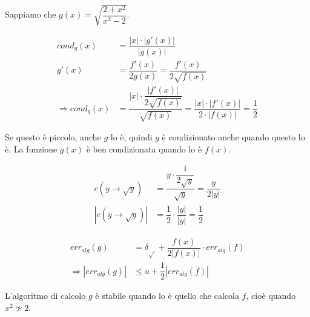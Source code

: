 Sappiamo che $g(x)=\sqrt{\dfrac{2+x^2}{x^2-2}}$.

\begin{center}
\end{center}

\begin{equation*}
\begin{split}
  cond_g(x) &= \dfrac{|x|\cdot|g'(x)|}{|g(x)|}\\[1.5ex]
  g'(x) &= \dfrac{f'(x)}{2g(x)} = \dfrac{f'(x)}{2\sqrt{f(x)}}\\[1.5ex]
  \Rightarrow cond_g(x) &= \dfrac{|x|\cdot \dfrac{|f'(x)|}{2\sqrt{f(x)}}}{\sqrt{f(x)}} = \dfrac{|x|\cdot |f'(x)|}{2\cdot |f(x)|} = \dfrac{1}{2}
\end{split}
\end{equation*}

Se questo è piccolo, anche $g$ lo è, quindi $g$ è condizionato anche quando questo lo è. La funzione $g(x)$ è ben condizionata quando lo è $f(x)$.

\begin{equation*}
\begin{split}
  c(y\rightarrow \sqrt{y}) &= \dfrac{y\cdot \dfrac{1}{2\sqrt{y}}}{\sqrt{y}} = \dfrac{y}{2|y|}\\[1.5ex]
  |c(y\rightarrow \sqrt{y})| &= \dfrac{1}{2}\cdot \dfrac{|y|}{|y|} = \dfrac{1}{2}
\end{split}
\end{equation*}

\begin{equation*}
\begin{split}
  err_{alg}(g) &= \delta_{\sqrt{~}} + \dfrac{f(x)}{2|f(x)|}\cdot err_{alg}(f)\\[1.5ex]
  \Rightarrow |err_{alg}(g)| &\leq u+\dfrac{1}{2} |err_{alg}(f)|
\end{split}
\end{equation*}

L'algoritmo di calcolo $g$ è stabile quando lo è quello che calcola $f$, cioè quando $x^2\not\simeq 2$.

